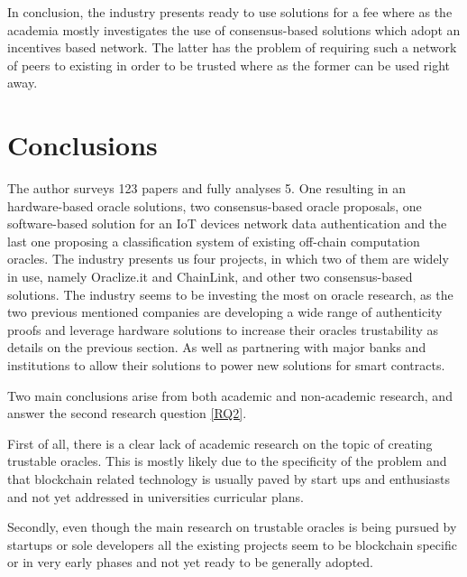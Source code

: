 In conclusion, the industry presents ready to use solutions for a fee where as the academia mostly investigates the use of consensus-based solutions which adopt an incentives based network. The latter has the problem of requiring such a network of peers to existing in order to be trusted where as the former can be used right away.

\section{Conclusions}

The author surveys 123 papers and fully analyses 5. One resulting in an hardware-based oracle solutions, two consensus-based oracle proposals, one software-based solution for an IoT devices network data authentication and the last one proposing a classification system of existing off-chain computation oracles. The industry presents us four projects, in which two of them are widely in use, namely Oraclize.it and ChainLink, and other two consensus-based solutions. The industry seems to be investing the most on oracle research, as the two previous mentioned companies are developing a wide range of authenticity proofs and leverage hardware solutions to increase their oracles trustability as details on the previous section. As well as partnering with major banks and institutions to allow their solutions to power new solutions for smart contracts.

Two main conclusions arise from both academic and non-academic research, and answer the second research question \ref{RQ2}.

First of all, there is a clear lack of academic research on the topic of creating trustable oracles. This is mostly likely due to the specificity of the problem and that blockchain related technology is usually paved by start ups and enthusiasts and not yet addressed in universities curricular plans.

Secondly, even though the main research on trustable oracles is being pursued by startups or sole developers all the existing projects seem to be blockchain specific or in very early phases and not yet ready to be generally adopted.
